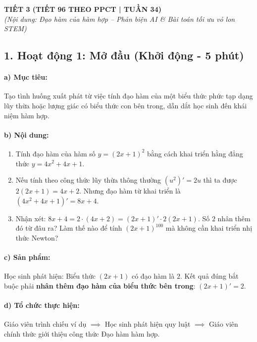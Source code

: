 \documentclass[12pt, a4paper]{article}
\begin{document}
\newpage

\begin{center}
    \textbf{\large TIẾT 3 (TIẾT 96 THEO PPCT | TUẦN 34)}\\[4pt]
    \textit{(Nội dung: Đạo hàm của hàm hợp -- Phản biện AI \& Bài toán tối ưu vỏ lon STEM)}
\end{center}

\subsection*{1. Hoạt động 1: Mở đầu (Khởi động - 5 phút)}

\paragraph{a) Mục tiêu:} Tạo tình huống xuất phát từ việc tính đạo hàm của một biểu thức phức tạp dạng lũy thừa hoặc lượng giác có biểu thức con bên trong, dẫn dắt học sinh đến khái niệm hàm hợp.

\paragraph{b) Nội dung:}
\begin{enumerate}[leftmargin=0.6cm]
    \item Tính đạo hàm của hàm số $y = (2x + 1)^2$ bằng cách khai triển hằng đẳng thức $y = 4x^2 + 4x + 1$.
    \item Nếu tính theo công thức lũy thừa thông thường $(u^2)' = 2u$ thì ta được $2(2x + 1) = 4x + 2$. Nhưng đạo hàm từ khai triển là $(4x^2 + 4x + 1)' = 8x + 4$.
    \item Nhận xét: $8x + 4 = 2 \cdot (4x + 2) = (2x + 1)' \cdot 2(2x + 1)$. Số $2$ nhân thêm đó từ đâu ra? Làm thế nào để tính $(2x + 1)^{100}$ mà không cần khai triển nhị thức Newton?
\end{enumerate}

\paragraph{c) Sản phẩm:} Học sinh phát hiện: Biểu thức $(2x + 1)$ có đạo hàm là $2$. Kết quả đúng bắt buộc phải \textbf{nhân thêm đạo hàm của biểu thức bên trong}: $(2x + 1)' = 2$.

\paragraph{d) Tổ chức thực hiện:} Giáo viên trình chiếu ví dụ $\implies$ Học sinh phát hiện quy luật $\implies$ Giáo viên chính thức giới thiệu công thức Đạo hàm hàm hợp.
\end{document}
